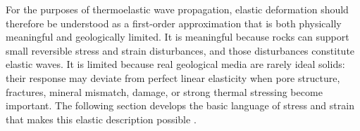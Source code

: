 For the purposes of thermoelastic wave propagation, elastic deformation should therefore be understood as a first-order approximation that is both physically meaningful and geologically limited. It is meaningful because rocks can support small reversible stress and strain disturbances, and those disturbances constitute elastic waves. It is limited because real geological media are rarely ideal solids: their response may deviate from perfect linear elasticity when pore structure, fractures, mineral mismatch, damage, or strong thermal stressing become important. The following section develops the basic language of stress and strain that makes this elastic description possible \cite{jaeger2007,mavko2009,cornet2007}.